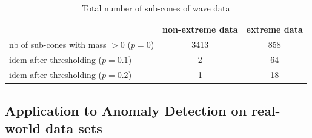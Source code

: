 \begin{table}[!ht]
\centering
\footnotesize
\begin{tabular}{|l|cc|}
\hline
~ & non-extreme data & extreme data \\
\hline
nb of sub-cones with mass $>0$ ($p = 0$) & 3413 & 858 \\
idem after thresholding ($p = 0.1$) & 2 & 64 \\
idem after thresholding ($p = 0.2$) & 1 & 18 \\ 
\hline
\end{tabular}
\caption{Total number of sub-cones of wave data}
\label{jmva:fig:wavedata-nb-faces}
\end{table}


\subsection{Application to Anomaly Detection on real-world data sets}


